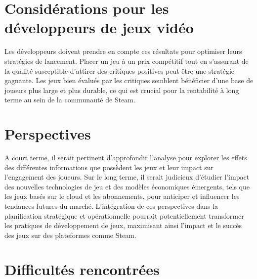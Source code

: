 \documentclass[mstat,12pt]{unswthesis}
\begin{document}
\hypertarget{considuxe9rations-pour-les-duxe9veloppeurs-de-jeux-viduxe9o}{%
\section{Considérations pour les développeurs de jeux
vidéo}\label{considuxe9rations-pour-les-duxe9veloppeurs-de-jeux-viduxe9o}}

Les développeurs doivent prendre en compte ces résultats pour optimiser
leurs stratégies de lancement. Placer un jeu à un prix compétitif tout
en s'assurant de la qualité susceptible d'attirer des critiques
positives peut être une stratégie gagnante. Les jeux bien évalués par
les critiques semblent bénéficier d'une base de joueurs plus large et
plus durable, ce qui est crucial pour la rentabilité à long terme au
sein de la communauté de Steam.

\hypertarget{perspectives}{%
\section{Perspectives}\label{perspectives}}

A court terme, il serait pertinent d'approfondir l'analyse pour explorer
les effets des différentes informations que possèdent les jeux et leur
impact sur l'engagement des joueurs. Sur le long terme, il serait
judicieux d'étudier l'impact des nouvelles technologies de jeu et des
modèles économiques émergents, tels que les jeux basés sur le cloud et
les abonnements, pour anticiper et influencer les tendances futures du
marché. L'intégration de ces perspectives dans la planification
stratégique et opérationnelle pourrait potentiellement transformer les
pratiques de développement de jeux, maximisant ainsi l'impact et le
succès des jeux sur des plateformes comme Steam.

\hypertarget{difficultuxe9s-rencontruxe9es}{%
\section{Difficultés rencontrées}\label{difficultuxe9s-rencontruxe9es}}
\end{document}
